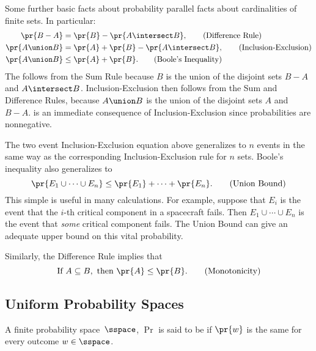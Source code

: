 Some further basic facts about probability parallel facts about
cardinalities of finite sets.  In particular:
\begin{align}
\pr{B-A}        & =  \pr{B} - \pr{A \intersect B},\tag{Difference Rule}\\
\pr{A \union B} & =  \pr{A} + \pr{B} - \pr{A \intersect B},
                  \tag{Inclusion-Exclusion}\\
\pr{A \union B} & \le  \pr{A} + \pr{B}. \tag{Boole's Inequality}
\end{align}
The  follows from the Sum Rule because $B$ is the
union of the disjoint sets $B-A$ and $A \intersect B$.
 Inclusion-Exclusion then
follows from the Sum and Difference Rules, because $A \union B$ is the
union of the disjoint sets $A$ and $B-A$.   is an
immediate consequence of Inclusion-Exclusion since probabilities are
nonnegative.

The two event Inclusion-Exclusion equation above generalizes to $n$ events
in the same way as the corresponding Inclusion-Exclusion rule for $n$
sets.  Boole's inequality also generalizes to
\begin{equation}
    \pr{E_1 \cup \cdots \cup E_n} \leq \pr{E_1} + \cdots + \pr{E_n}.\tag{Union Bound}
\end{equation}
This simple  is useful in many calculations.  For
example, suppose that $E_i$ is the event that the $i$-th critical
component in a spacecraft fails.  Then $E_1 \cup \cdots \cup E_n$ is
the event that \emph{some} critical component fails.  The Union Bound
can give an adequate upper bound on this vital probability.

Similarly, the Difference Rule implies that
\begin{equation}\label{LN12:subsetbound}
\text{If } A \subseteq B, \text{ then } \pr{A} \le \pr{B}.\tag{Monotonicity}
\end{equation}

\subsection{Uniform Probability Spaces}

\begin{definition}\label{def:uniform_pspace}
A finite probability space~$\sspace$, $\Pr$ is said to be
 if $\pr{w}$ is the same for every outcome $w
\in \sspace$.
\end{definition}

